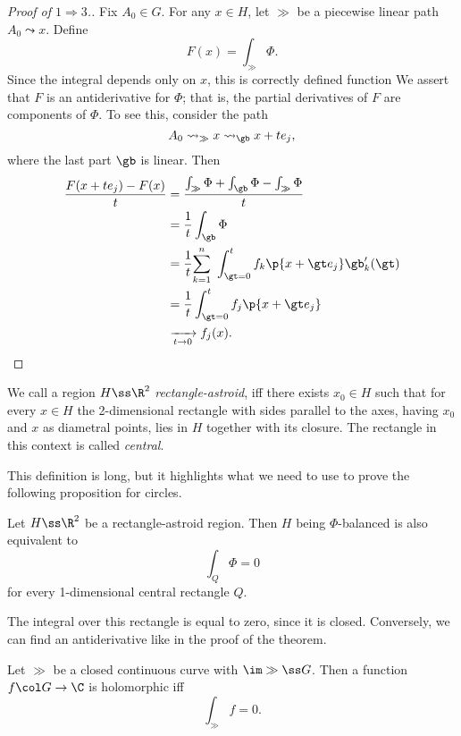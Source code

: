 \documentclass[a4paper, 12pt]{article}
\begin{document}
\begin{proof}[Proof of $1 \Rightarrow 3$.]
  Fix $A_0 \in G$. For any $x \in H$, let $\gg$ be a piecewise linear path $A_0 \leadsto x$. Define
  $$ F(x) = \int_\gg \Phi. $$
  Since the integral depends only on $x$, this is correctly defined function
  We assert that $F$ is an antiderivative for $\Phi$; that is, the partial derivatives of $F$ are components of $\Phi$.
  To see this, consider the path
  $$ A_0 \leadsto_\gg x \leadsto_\gb x+te_j, $$
  where the last part $\gb$ is linear.
  Then
  \begin{align*}
    \frac{F(x+te_j) - F(x)}{t}
    &= \frac{\int_\gg \Phi + \int_{\gb} \Phi - \int_\gg \Phi}{t}  \\
    &= \frac{1}{t} \int_{\gb} \Phi \\
    &= \frac{1}{t} { \sum_{k=1}^n\ \int_{\gt=0}^t f_k\p{x+\gt e_j} \gb_k'(\gt) } \\
    &= \frac{1}{t} \int_{\gt=0}^t f_j\p{x+\gt e_j} \\
    &\xrightarrow[t \to 0]{} {f_j(x)}.
  \end{align*}
\end{proof}

\begin{definition}
  We call a region $H \ss \R^2$ \emph{rectangle-astroid}, iff there exists $x_0 \in H$ such that for every $x \in H$ the 2-dimensional rectangle with sides parallel to the axes, having $x_0$ and $x$ as diametral points, lies in $H$ together with its closure. The rectangle in this context is called \emph{central}.
\end{definition}

This definition is long, but it highlights what we need to use to prove the following proposition for circles.

\begin{lemma}
  Let $H \ss \R^2$ be a rectangle-astroid region. Then $H$ being $\Phi$-balanced is also equivalent to
  $$ \int_Q \Phi = 0 $$
  for every 1-dimensional central rectangle $Q$. 
\end{lemma}

\begin{idea}
  The integral over this rectangle is equal to zero, since it is closed. Conversely, we can find an antiderivative like in the proof of the theorem.
\end{idea}

\begin{theorem}
  Let $\gg$ be a closed continuous curve with $\im \gg \ss G$.
  Then a function $f \col G \to \C$ is holomorphic iff
  $$ \int_\gg f = 0. $$
\end{theorem}
\end{document}
